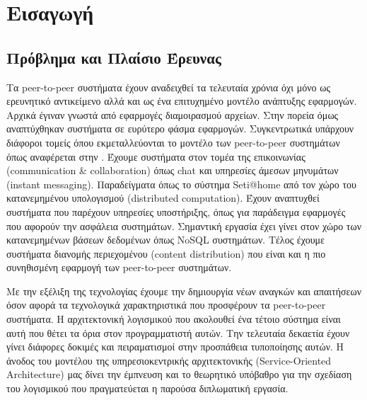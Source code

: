 \chapter{Εισαγωγή}
\label{chap:Intro}

\section{Πρόβλημα και Πλαίσιο Έρευνας}

Τα peer-to-peer συστήματα έχουν αναδειχθεί τα τελευταία χρόνια όχι μόνο 
ως ερευνητικό αντικείμενο αλλά και ως ένα επιτυχημένο μοντέλο ανάπτυξης 
εφαρμογών. Αρχικά έγιναν γνωστά από εφαρμογές διαμοιρασμού αρχείων. Στην 
πορεία όμως αναπτύχθηκαν συστήματα σε ευρύτερο φάσμα εφαρμογών. 
Συγκεντρωτικά υπάρχουν διάφοροι τομείς όπου εκμεταλλεύονται το μοντέλο 
των peer-to-peer συστημάτων όπως αναφέρεται στην 
\citep{Androutsellis-Theotokis2004}. Έχουμε συστήματα στον τομέα της 
επικοινωνίας (communication \& collaboration) όπως chat και υπηρεσίες 
άμεσων μηνυμάτων (instant messaging). Παραδείγματα όπως το σύστημα Seti@home 
από τον χώρο του κατανεμημένου υπολογισμού (distributed computation). 
Έχουν αναπτυχθεί συστήματα που παρέχουν υπηρεσίες υποστήριξης, όπως για 
παράδειγμα εφαρμογές που αφορούν την ασφάλεια συστημάτων. Σημαντική 
εργασία έχει γίνει στον χώρο των κατανεμημένων βάσεων δεδομένων όπως 
NoSQL συστημάτων. Τέλος έχουμε συστήματα διανομής περιεχομένου (content 
distribution) που είναι και η πιο συνηθισμένη εφαρμογή των peer-to-peer 
συστημάτων.

Με την εξέλιξη της τεχνολογίας έχουμε την δημιουργία νέων αναγκών και 
απαιτήσεων όσον αφορά τα τεχνολογικά χαρακτηριστικά που προσφέρουν τα 
peer-to-peer συστήματα. Η αρχιτεκτονική λογισμικού που ακολουθεί ένα 
τέτοιο σύστημα είναι αυτή που θέτει τα όρια στον προγραμματιστή αυτών. 
Την τελευταία δεκαετία έχουν γίνει διάφορες δοκιμές και πειραματισμοί 
στην προσπάθεια τυποποίησης αυτών. Η άνοδος του μοντέλου της 
υπηρεσιοκεντρικής αρχιτεκτονικής (Service-Oriented Architecture) μας 
δίνει την έμπνευση και το θεωρητικό υπόβαθρο για την σχεδίαση του 
λογισμικού που πραγματεύεται η παρούσα διπλωματική εργασία.

